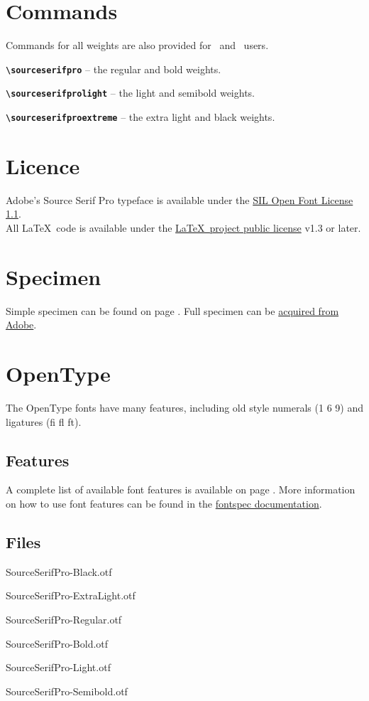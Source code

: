 \documentclass[10pt,a4paper,english]{article}
\begin{document}
\begin{multicols}{2}
\section{Commands}
Commands for all weights are also provided for \XeLaTeX\ and \LuaLaTeX\ users.
\begin{itemize*}
	\item \texttt{\bfseries \textbackslash sourceserifpro}
		-- the regular and bold weights.
	\item \texttt{\bfseries \textbackslash sourceserifprolight}
		-- the light and semibold weights.
	\item \texttt{\bfseries \textbackslash sourceserifproextreme}
		-- the extra light and black weights.
\end{itemize*}

\section{Licence}
Adobe's Source Serif Pro typeface is available under the \href{http://scripts.sil.org/OFL}{SIL Open Font License 1.1}.\\
All \LaTeX\ code is available under the \href{http://www.latex-project.org/lppl/}{\LaTeX\ project public license} v1.3 or later.

\section{Specimen}
Simple specimen can be found on page \pageref{sec:specimen}. Full specimen can be \href{http://store1.adobe.com/type/browser/pdfs/1966.pdf}{acquired from Adobe}.

\section{OpenType}
The OpenType fonts have many features, including old style numerals (1 6 9) and ligatures (fi fl ft).

\subsection{Features}
A complete list of available font features is available on page \pageref{sec:otfinfo}. More information on how to use font features can be found in the \href{http://mirror.ctan.org/macros/latex/contrib/fontspec/fontspec.pdf}{fontspec documentation}.

\subsection{Files}
\begin{itemize*}
	\item SourceSerifPro-Black.otf
	\item SourceSerifPro-ExtraLight.otf
	\item SourceSerifPro-Regular.otf
	\item SourceSerifPro-Bold.otf
	\item SourceSerifPro-Light.otf
	\item SourceSerifPro-Semibold.otf
\end{itemize*}


\end{multicols}
\end{document}
